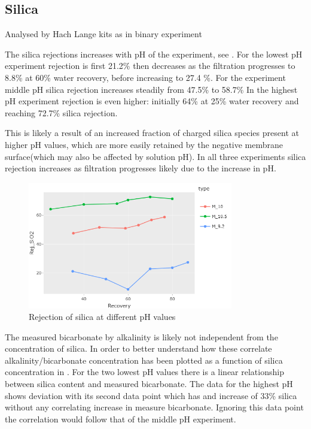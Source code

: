 \subsection{Silica}
Analysed by Hach Lange kits as in binary experiment 

The silica rejections increases with pH of the experiment, see .
For the lowest pH experiment rejection is first 21.2\% then decreases as the filtration progresses to 8.8\% at 60\% water recovery, before increasing to 27.4 \%. 
For the experiment middle pH silica rejection increases steadily from 47.5\% to 58.7\%
In the highest pH experiment rejection is even higher: initially 64\% at 25\% water recovery and reaching 72.7\% silica rejection. 

This is likely a result of an increased fraction of charged silica species present at higher pH values, which are more easily retained by the negative membrane surface(which may also be affected by solution pH).
In all three experiments silica rejection increases as filtration progresses likely due to the increase in pH.









\begin{figure}[H]
    \centering
    \includegraphics[width=0.8\textwidth]{Billeder/data/multi_salt/silica_rejection.png}
    \caption{Rejection of silica at different pH values}
    \label{fig:silica_rejection_multi_salt}
\end{figure}

The measured bicarbonate by alkalinity is likely not independent from the concentration of silica.
In order to better understand how these correlate alkalinity/bicarbonate concentration has been plotted as a function of silica concentration in .
For the two lowest pH values there is a linear relationship between silica content and measured bicarbonate.
The data for the highest pH shows deviation with its second data point which has and increase of 33\% silica without any correlating increase in measure bicarbonate.
Ignoring this data point the correlation would follow that of the middle pH experiment.

